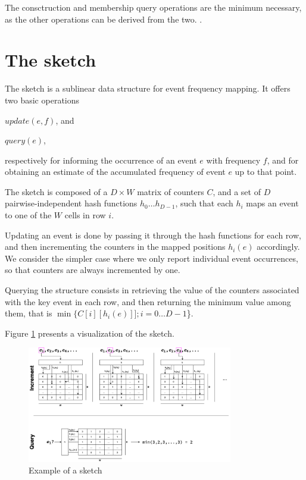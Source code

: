 The consctruction and membership query operations are the minimum necessary, as the other operations can be derived from the two. .

\section{The \cm sketch}
\label{sec:countmin}

The \cm sketch \cite{Cormode2005} is a sublinear data structure for event frequency mapping.
It offers two basic operations
\begin{compactenum}
\item $update(e, f)$, and
\item $query(e)$,
\end{compactenum}
respectively for informing the occurrence of an event $e$ with frequency $f$, and for obtaining an estimate of the accumulated frequency of event $e$ up to that point.

The sketch is composed of a $D\times W$ matrix of counters $C$, and a set of $D$ pairwise-independent hash functions $h_0\ldots h_{D-1}$, such that each $h_i$ maps an event to one of the $W$ cells in row $i$.


Updating an event is done by passing it through the hash functions for each row, and then incrementing the counters in
the mapped positions $h_i(e)$ accordingly. 
We consider the simpler case where we only report individual event occurrences, so that counters are always incremented by one.

Querying the structure consists in retrieving the value of the counters associated with the key event in each row,  and then returning
the minimum value among them, that is $\min\{C[i][h_i(e)]]; i=0\ldots D-1$\}.


Figure \ref{fig:countminexample} presents a visualization of the \cm sketch.

\begin{figure}[htbp]
	\begin{center}
    \includegraphics[width=0.8\textwidth]{figures/cm-example}
	\end{center}
	\caption{Example of a \cm sketch}\label{fig:countminexample}
\end{figure}

